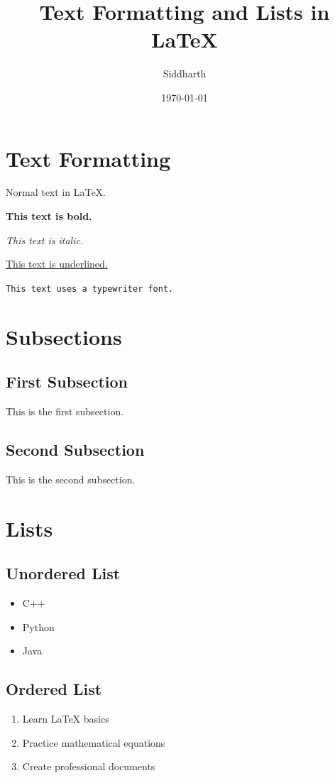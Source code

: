 \documentclass{article}
\title{Text Formatting and Lists in LaTeX}
\author{Siddharth}
\date{\today}
\begin{document}
\maketitle

\section{Text Formatting}

Normal text in LaTeX.

\textbf{This text is bold.}

\textit{This text is italic.}

\underline{This text is underlined.}

\texttt{This text uses a typewriter font.}

\section{Subsections}

\subsection{First Subsection}
This is the first subsection.

\subsection{Second Subsection}
This is the second subsection.

\section{Lists}

\subsection{Unordered List}

\begin{itemize}
    \item C++
    \item Python
    \item Java
\end{itemize}

\subsection{Ordered List}

\begin{enumerate}
    \item Learn LaTeX basics
    \item Practice mathematical equations
    \item Create professional documents
\end{enumerate}
\end{document}
